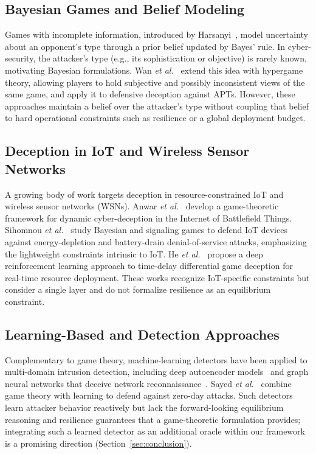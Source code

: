 \documentclass[conference]{IEEEtran}
\begin{document}
\subsection{Bayesian Games and Belief Modeling}

Games with incomplete information, introduced by Harsanyi~\cite{harsanyi1967},
model uncertainty about an opponent's type through a prior belief updated by
Bayes' rule. In cyber-security, the attacker's type (e.g., its sophistication
or objective) is rarely known, motivating Bayesian formulations. Wan
\textit{et al.}~\cite{wan2022} extend this idea with hypergame theory, allowing
players to hold subjective and possibly inconsistent views of the same game,
and apply it to defensive deception against APTs. However, these approaches
maintain a belief over the attacker's type without coupling that belief to hard
operational constraints such as resilience or a global deployment budget.

\subsection{Deception in IoT and Wireless Sensor Networks}

A growing body of work targets deception in resource-constrained IoT and
wireless sensor networks (WSNs). Anwar \textit{et al.}~\cite{anwar2020} develop
a game-theoretic framework for dynamic cyber-deception in the Internet of
Battlefield Things. Sihomnou \textit{et al.}~\cite{sihomnou2025,sihomnou2025b}
study Bayesian and signaling games to defend IoT devices against energy-depletion
and battery-drain denial-of-service attacks, emphasizing the lightweight
constraints intrinsic to IoT. He \textit{et al.}~\cite{he2026} propose a deep
reinforcement learning approach to time-delay differential game deception for
real-time resource deployment. These works recognize IoT-specific constraints
but consider a single layer and do not formalize resilience as an equilibrium
constraint.

\subsection{Learning-Based and Detection Approaches}

Complementary to game theory, machine-learning detectors have been applied to
multi-domain intrusion detection, including deep autoencoder
models~\cite{musa2023} and graph neural networks that deceive network
reconnaissance~\cite{njanko2023}. Sayed \textit{et al.}~\cite{sayed2023}
combine game theory with learning to defend against zero-day attacks. Such
detectors learn attacker behavior reactively but lack the forward-looking
equilibrium reasoning and resilience guarantees that a game-theoretic
formulation provides; integrating such a learned detector as an additional
oracle within our framework is a promising direction
(Section~\ref{sec:conclusion}).
\end{document}
